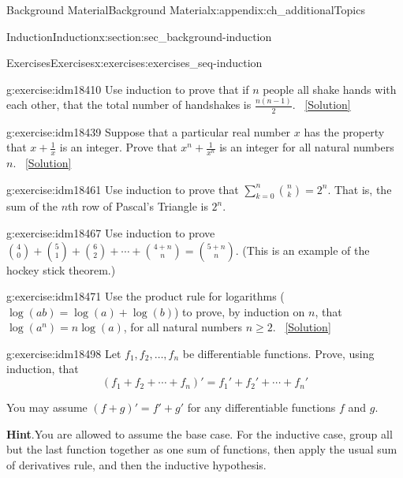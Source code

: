 \documentclass[oneside,10pt,]{book}
\numberwithin{equation}{chapter}
\def\d{\displaystyle}
\begin{document}
\begin{appendixptx}{Background Material}{}{Background Material}{}{}{x:appendix:ch_additionalTopics}
\begin{sectionptx}{Induction}{}{Induction}{}{}{x:section:sec_background-induction}
\begin{exercises-subsection}{Exercises}{}{Exercises}{}{}{x:exercises:exercises_seq-induction}
\begin{divisionexercise}{17}{}{}{g:exercise:idm18410}%
Use induction to prove that if \(n\) people all shake hands with each other, that the total number of handshakes is \(\frac{n(n-1)}{2}\).%
\qquad~\hfill{\tiny\hyperlink{g:solution:idm18415-main}{[Solution]}}\end{divisionexercise}%
\begin{divisionexercise}{18}{}{}{g:exercise:idm18439}%
Suppose that a particular real number \(x\) has the property that \(x + \frac{1}{x}\) is an integer. Prove that \(x^n + \frac{1}{x^n}\) is an integer for all natural numbers \(n\).%
\qquad~\hfill{\tiny\hyperlink{g:solution:idm18446-main}{[Solution]}}\end{divisionexercise}%
\begin{divisionexercise}{19}{}{}{g:exercise:idm18461}%
Use induction to prove that \(\d\sum_{k=0}^n {n \choose k} = 2^n\). That is, the sum of the \(n\)th row of Pascal's Triangle is \(2^n\).%
\end{divisionexercise}%
\begin{divisionexercise}{20}{}{}{g:exercise:idm18467}%
Use induction to prove \({4 \choose 0} + {5 \choose 1} + {6 \choose 2} + \cdots + {4+n \choose n} = {5+n \choose n}\). (This is an example of the hockey stick theorem.)%
\end{divisionexercise}%
\begin{divisionexercise}{21}{}{}{g:exercise:idm18471}%
Use the product rule for logarithms (\(\log(ab) = \log(a) + \log(b)\)) to prove, by induction on \(n\), that \(\log(a^n) = n \log(a)\), for all natural numbers \(n \ge 2\).%
\qquad~\hfill{\tiny\hyperlink{g:solution:idm18478-main}{[Solution]}}\end{divisionexercise}%
\begin{divisionexercise}{22}{}{}{g:exercise:idm18498}%
Let \(f_1, f_2,\ldots, f_n\) be differentiable functions. Prove, using induction, that%
\begin{equation*}
(f_1 + f_2 + \cdots + f_n)' = f_1' + f_2' + \cdots + f_n'
\end{equation*}
%
\par
You may assume \((f+g)' = f' + g'\) for any differentiable functions \(f\) and \(g\).%
\par\smallskip%
\noindent\textbf{Hint}.\hypertarget{g:hint:idm18507}{}\quad{}You are allowed to assume the base case. For the inductive case, group all but the last function together as one sum of functions, then apply the usual sum of derivatives rule, and then the inductive hypothesis.%

\end{divisionexercise}
\end{exercises-subsection}
\end{sectionptx}
\end{appendixptx}
\end{document}
